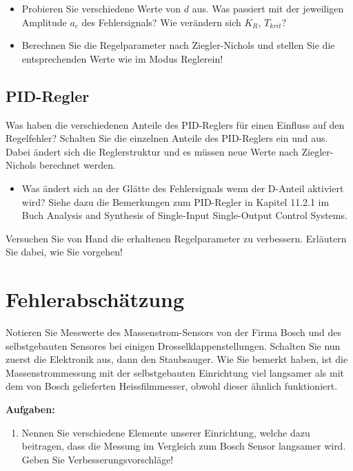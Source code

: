 \documentclass[a4paper,10pt,oneside]{article}
\begin{document}
\begin{itemize}
\item Probieren Sie verschiedene Werte von $d$ aus. Was passiert mit der jeweiligen Amplitude $a_c$ des Fehlersignals? Wie verändern sich $K_R$, $T_{krit}$?
\item Berechnen Sie die Regelparameter nach Ziegler-Nichols und stellen Sie die entsprechenden Werte wie    im Modus \glqq Regler\grqq ein!
\end{itemize}


\subsection{PID-Regler}

Was haben die verschiedenen Anteile des PID-Reglers für einen Einfluss auf den Regelfehler? Schalten Sie die einzelnen Anteile des PID-Reglers ein und aus. Dabei ändert sich die Reglerstruktur und es müssen neue Werte nach Ziegler-Nichols berechnet werden.

\begin{itemize}
\item Was ändert sich an der Glätte des Fehlersignals wenn der D-Anteil aktiviert wird? Siehe dazu die Bemerkungen zum PID-Regler in Kapitel 11.2.1 im Buch Analysis and Synthesis of Single-Input Single-Output Control Systems.
\end{itemize}

Versuchen Sie von Hand die erhaltenen Regelparameter zu verbessern. Erläutern Sie dabei, wie Sie vorgehen!

\newpage
\section{Fehlerabschätzung}
Notieren Sie Messwerte des Massenstrom-Sensors von der Firma Bosch und des selbstgebauten Sensores bei einigen Drosselklappenstellungen. Schalten Sie nun zuerst die Elektronik aus, dann den Staubsauger. 
Wie Sie bemerkt haben, ist die Massenstrommessung mit der selbstgebauten Einrichtung viel langsamer als mit dem von Bosch gelieferten Heissfilmmesser, obwohl dieser ähnlich funktioniert.


\textbf{Aufgaben:}
\begin{enumerate}
\item Nennen Sie verschiedene Elemente unserer Einrichtung, welche dazu beitragen, dass die Messung im Vergleich zum Bosch Sensor langsamer wird. Geben Sie Verbesserungsvorschläge!
\end{enumerate}
\end{document}
